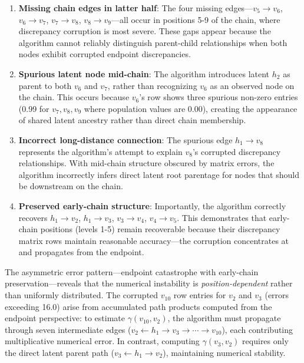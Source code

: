\documentclass[11pt,a4paper]{article}
\numberwithin{equation}{section}
\begin{document}
\begin{enumerate}[label=(\arabic*)]
\item \textbf{Missing chain edges in latter half}: The four missing edges—$v_5 \to v_6$, $v_6 \to v_7$, $v_7 \to v_8$, $v_8 \to v_9$—all occur in positions 5-9 of the chain, where discrepancy corruption is most severe. These gaps appear because the algorithm cannot reliably distinguish parent-child relationships when both nodes exhibit corrupted endpoint discrepancies.

\item \textbf{Spurious latent node mid-chain}: The algorithm introduces latent $h_2$ as parent to both $v_6$ and $v_7$, rather than recognizing $v_6$ as an observed node on the chain. This occurs because $v_6$'s row shows three spurious non-zero entries (0.99 for $v_7, v_8, v_9$ where population values are 0.00), creating the appearance of shared latent ancestry rather than direct chain membership.

\item \textbf{Incorrect long-distance connection}: The spurious edge $h_1 \to v_8$ represents the algorithm's attempt to explain $v_8$'s corrupted discrepancy relationships. With mid-chain structure obscured by matrix errors, the algorithm incorrectly infers direct latent root parentage for nodes that should be downstream on the chain.

\item \textbf{Preserved early-chain structure}: Importantly, the algorithm correctly recovers $h_1 \to v_2$, $h_1 \to v_3$, $v_3 \to v_4$, $v_4 \to v_5$. This demonstrates that early-chain positions (levels 1-5) remain recoverable because their discrepancy matrix rows maintain reasonable accuracy—the corruption concentrates at and propagates from the endpoint.
\end{enumerate}

The asymmetric error pattern—endpoint catastrophe with early-chain preservation—reveals that the numerical instability is \emph{position-dependent} rather than uniformly distributed. The corrupted $v_{10}$ row entries for $v_2$ and $v_3$ (errors exceeding 16.0) arise from accumulated path products computed from the endpoint perspective: to estimate $\gamma(v_{10}, v_2)$, the algorithm must propagate through seven intermediate edges ($v_2 \leftarrow h_1 \to v_3 \to \cdots \to v_{10}$), each contributing multiplicative numerical error. In contrast, computing $\gamma(v_3, v_2)$ requires only the direct latent parent path ($v_3 \leftarrow h_1 \to v_2$), maintaining numerical stability.
\end{document}
